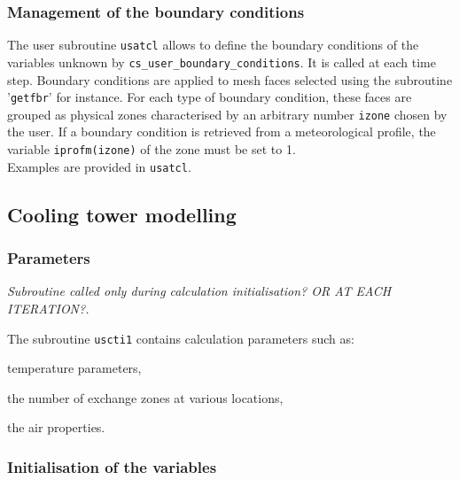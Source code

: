 {{{%
\subsubsection{Management of the boundary conditions}

The user subroutine \texttt{usatcl} allows to define the boundary conditions of the variables
 unknown by \texttt{cs\_user\_boundary\_conditions}. It is called at each time step. Boundary conditions are 
applied to mesh faces selected using the subroutine '\texttt{getfbr}' for instance. For 
each type of boundary condition, these faces are grouped as physical zones characterised
 by an arbitrary number \texttt{izone} chosen by the user. If a boundary condition is 
retrieved from a meteorological profile, the variable \texttt{iprofm(izone)} of the zone
 must be set to 1.\\
Examples are provided in \texttt{usatcl}.

\subsection{Cooling tower modelling}

\subsubsection{Parameters}

\noindent
\textit{Subroutine called only during calculation initialisation? OR AT EACH ITERATION?.}

The subroutine \texttt{uscti1} contains calculation parameters such as:
\begin{list}{-}{}
 \item  temperature parameters,
 \item  the number of exchange zones at various locations,
 \item  the air properties.
\end{list}

\subsubsection{Initialisation of the variables}

}}}
